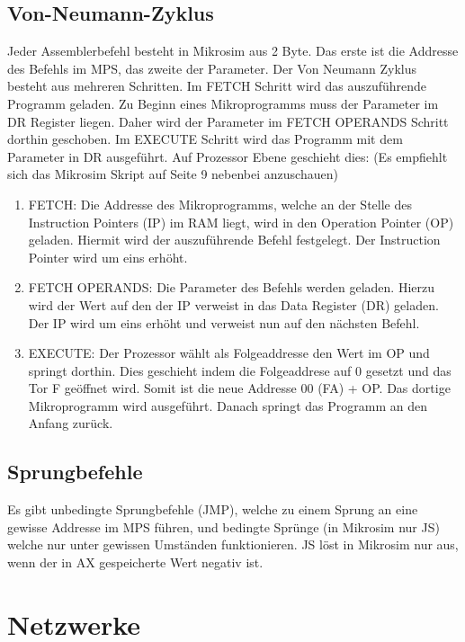 \documentclass{article}
\begin{document}
\subsection*{Von-Neumann-Zyklus}
Jeder Assemblerbefehl besteht in Mikrosim aus 2 Byte. Das erste ist die Addresse des Befehls im MPS, das zweite der Parameter.\newline
Der Von Neumann Zyklus besteht aus mehreren Schritten.\newline
Im FETCH Schritt wird das auszuführende Programm geladen.\newline
Zu Beginn eines Mikroprogramms muss der Parameter im DR Register liegen. Daher wird der Parameter im FETCH OPERANDS Schritt dorthin geschoben.\newline
Im EXECUTE Schritt wird das Programm mit dem Parameter in DR ausgeführt.\newline
Auf Prozessor Ebene geschieht dies: (Es empfiehlt sich das Mikrosim Skript auf Seite 9 nebenbei anzuschauen)
\begin{enumerate}
    \item FETCH: Die Addresse des Mikroprogramms, welche an der Stelle des Instruction Pointers (IP) im RAM liegt, wird in den Operation Pointer
    (OP) geladen. Hiermit wird der auszuführende Befehl festgelegt. Der Instruction Pointer wird um eins erhöht.
    \item FETCH OPERANDS: Die Parameter des Befehls werden geladen. Hierzu wird der Wert auf den der IP verweist in das Data Register (DR)
    geladen. Der IP wird um eins erhöht und verweist nun auf den nächsten Befehl.
    \item EXECUTE: Der Prozessor wählt als Folgeaddresse den Wert im OP und springt dorthin. Dies geschieht indem die Folgeaddrese auf 
    0 gesetzt und das Tor F geöffnet wird. Somit ist die neue Addresse 00 (FA) + OP. Das dortige Mikroprogramm wird ausgeführt.
    Danach springt das Programm an den Anfang zurück.
\end{enumerate}

\subsection*{Sprungbefehle}
Es gibt unbedingte Sprungbefehle (JMP), welche zu einem Sprung an eine gewisse Addresse im MPS führen, und bedingte Sprünge
(in Mikrosim nur JS) welche nur unter gewissen Umständen funktionieren. JS löst in Mikrosim nur aus, wenn der in AX gespeicherte
Wert negativ ist.

\section{Netzwerke}
\end{document}
